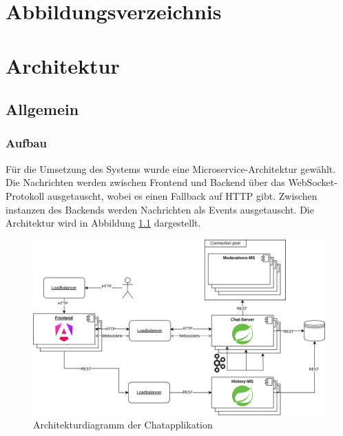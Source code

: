 \documentclass[12pt]{report}
\begin{document}
\renewcommand{\footrulewidth}{0.4pt} %


\renewcommand{\sectionmark}[1]{\markboth{#1}{}} 

\newpage


\tableofcontents
{}
\thispagestyle{plain}

\newpage
\chapter*{Abbildungsverzeichnis}

\listoffigures


\addtocounter{frontmatterPage}{\value{page}} 

\newpage
{}

\chapter{Architektur}
\section{Allgemein}
\subsection{Aufbau}
Für die Umsetzung des Systems wurde eine Microservice-Architektur gewählt. Die Nachrichten werden zwischen Frontend und Backend über das WebSocket-Protokoll ausgetauscht, wobei es einen Fallback auf HTTP gibt. Zwischen instanzen des Backends werden Nachrichten als Events ausgetauscht. Die Architektur wird in Abbildung \ref{fig:Architektur} dargestellt.
\begin{figure}[htbp]
	\centering
	\includegraphics[width=\linewidth]{architektur}
	\caption{Architekturdiagramm der Chatapplikation}
	\label{fig:Architektur}
\end{figure}
\end{document}
